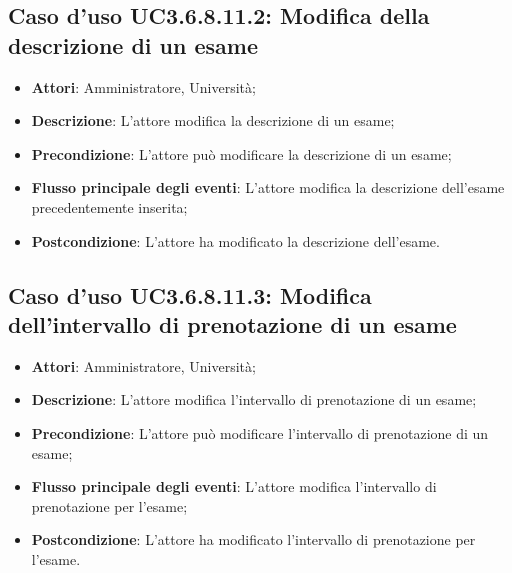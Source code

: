 \subsection{Caso d'uso \texorpdfstring{UC3.6.8.11.2}{UC3.6.8.11.2}: Modifica della descrizione di un esame}
\begin{itemize}
\item \textbf{Attori}: Amministratore, Università;
\item \textbf{Descrizione}: L'attore modifica la descrizione di un esame;

\item \textbf{Precondizione}: L'attore può modificare la descrizione di un esame;

\item \textbf{Flusso principale degli eventi}: L'attore modifica la descrizione dell’esame precedentemente inserita;

\item \textbf{Postcondizione}: L'attore ha modificato la descrizione dell’esame.

\end{itemize}
\subsection{Caso d'uso \texorpdfstring{UC3.6.8.11.3}{UC3.6.8.11.3}: Modifica dell’intervallo di prenotazione di un esame}
\begin{itemize}
\item \textbf{Attori}: Amministratore, Università;
\item \textbf{Descrizione}: L'attore modifica l'intervallo di prenotazione di un esame;

\item \textbf{Precondizione}: L'attore può modificare l'intervallo di prenotazione di un esame;

\item \textbf{Flusso principale degli eventi}: L'attore modifica l'intervallo di prenotazione per l’esame;

\item \textbf{Postcondizione}: L'attore ha modificato l'intervallo di prenotazione per l’esame.

\end{itemize}
